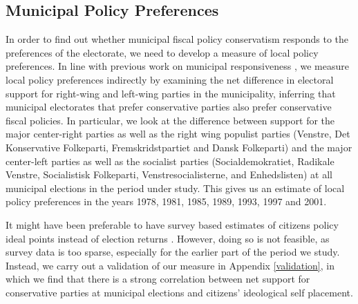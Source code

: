 \documentclass[a4paper,12pt]{article}
\begin{document}
\subsection*{Municipal Policy Preferences}

In order to find out whether municipal fiscal policy conservatism responds to the preferences of the electorate, we need to develop a measure of local policy preferences. In line with previous work on municipal responsiveness \cite[e.g.,][]{sances2017ideology,einstein2016pushing}, we measure local policy preferences indirectly by examining the net difference in electoral support for right-wing and left-wing parties in the municipality, inferring that municipal electorates that prefer conservative parties also prefer conservative fiscal policies. In particular, we look at the difference between support for the major center-right parties as well as the right wing populist parties (Venstre, Det Konservative Folkeparti, Fremskridstpartiet and Dansk Folkeparti) and the major center-left parties as well as the socialist parties (Socialdemokratiet, Radikale Venstre, Socialistisk Folkeparti, Venstresocialisterne, and Enhedslisten) at all municipal elections in the period under study. This gives us an estimate of local policy preferences in the years 1978, 1981, 1985, 1989, 1993, 1997 and 2001.

It might have been preferable to have survey based estimates of citizens policy ideal points instead of election returns \citep[similar to the measure used by][]{tausanovitch2014representation}. However, doing so is not feasible, as survey data is too sparse, especially for the earlier part of the period we study. Instead, we carry out a validation of our measure in Appendix \ref{validation}, in which we find that there is a strong correlation between net support for conservative parties at municipal elections and citizens' ideological self placement.
\end{document}
